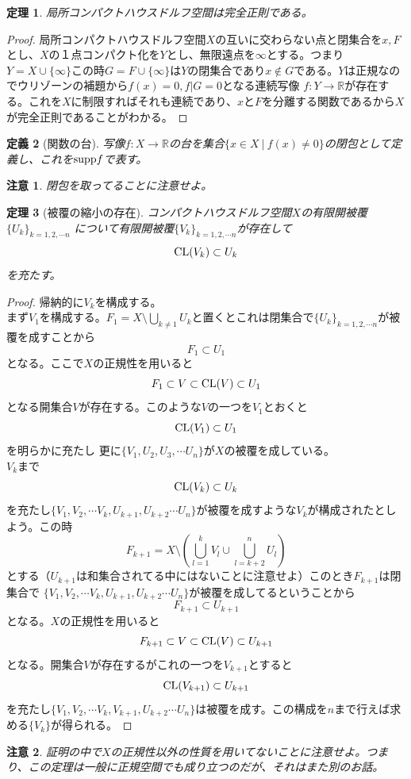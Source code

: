 \documentclass{jsarticle}
\newtheorem{thm}{定理}
\newtheorem{df}[thm]{定義}
\newtheorem*{cau}{注意}
\newcommand{\rr}{\mathbb{R}}
\newcommand{\mgn}{\infty}
\newcommand{\supp}{\text{{\rm supp}}}
\newcommand{\cl}{\text{{\rm CL}}}
\begin{document}
\begin{thm}
局所コンパクトハウスドルフ空間は完全正則である。
\end{thm}
\begin{proof}
局所コンパクトハウスドルフ空間$X$の互いに交わらない点と閉集合を$x,F$とし、$X$の１点コンパクト化を$Y$とし、無限遠点を$\mgn$とする。つまり$Y=X\cup\{\mgn\}$この時$G=F\cup \{\mgn\}$は$Y$の閉集合であり$x\not\in G$である。$Y$は正規なのでウリゾーンの補題から$f(x)=0,f|G=0$となる連続写像
$f:Y\to \rr$が存在する。これを$X$に制限すればそれも連続であり、$x$と$F$を分離する関数であるから$X$が完全正則であることがわかる。
\end{proof}

\begin{df}[関数の台]
写像$f:X\to \rr$の台を集合$\{x\in X\ |\ f(x)\neq 0\}$の閉包として定義し、これを$\supp f$で表す。
\end{df}
\begin{cau}
閉包を取ってることに注意せよ。
\end{cau}

\begin{thm}[被覆の縮小の存在]\label{cover}
コンパクトハウスドルフ空間$X$の有限開被覆$\{U_k\}_{k=1,2,\cdots n}$
について有限開被覆$\{V_k\}_{k=1,2,\cdots n}$が存在して
\[
\cl(V_k)\subset U_k
\]
を充たす。
\end{thm}

\begin{proof}
帰納的に$V_k$を構成する。\\ 
まず$V_1$を構成する。$F_1=X\setminus \bigcup_{k\neq1}U_k$と置くとこれは閉集合で$\{U_k\}_{k=1,2,\cdots n}$が被覆を成すことから
\[
F_1\subset U_1
\]
となる。ここで$X$の正規性を用いると
\[
F_1\subset V\subset \cl(V)\subset U_1
\]
となる開集合$V$が存在する。このような$V$の一つを$V_1$とおくと
\[
\cl(V_1)\subset U_1
\]
を明らかに充たし
更に$\{V_1,U_2,U_3,\cdots U_n\}$が$X$の被覆を成している。\\ 
$V_k$まで
\[
\cl(V_k)\subset U_k
\]
を充たし$\{V_1,V_2,\cdots V_k,U_{k+1},U_{k+2}\cdots U_n\}$が被覆を成すような$V_k$が構成されたとしよう。この時
\[
F_{k+1}=X\setminus \left( \bigcup_{l=1}^{k}V_l\cup\bigcup_{l=k+2}^{n}U_l \right)
\]
とする（$U_{k+1}$は和集合されてる中にはないことに注意せよ）このとき$F_{k+1}$は閉集合で
$\{V_1,V_2,\cdots V_k,U_{k+1},U_{k+2}\cdots U_n\}$が被覆を成してるということから
\[
F_{k+1}\subset U_{k+1}
\]
となる。$X$の正規性を用いると
\[
F_{k+1}\subset V\subset \cl(V) \subset U_{k+1}
\]
となる。開集合$V$が存在するがこれの一つを$V_{k+1}$とすると
\[
\cl(V_{k+1}) \subset U_{k+1}
\]
を充たし$\{V_1,V_2,\cdots V_k,V_{k+1},U_{k+2}\cdots U_n\}$は被覆を成す。この構成を$n$まで行えば求める$\{V_k\}$が得られる。
\end{proof}
\begin{cau}
証明の中で$X$の正規性以外の性質を用いてないことに注意せよ。つまり、この定理は一般に正規空間でも成り立つのだが、それはまた別のお話。
\end{cau}
\end{document}
